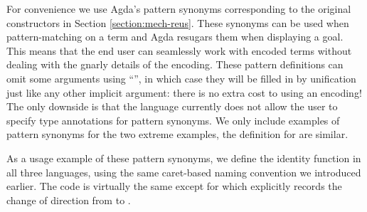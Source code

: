 \begin{center}
\begin{minipage}[t]{0.4\textwidth}
\end{minipage}\qquad
\begin{minipage}[t]{0.5\textwidth}
\end{minipage}
\end{center}

For convenience we use Agda's pattern synonyms corresponding to the
original constructors in Section \ref{section:mech-reus}. These
synonyms can be used when pattern-matching on a term and Agda resugars
them when displaying a goal. This means that the end user can
seamlessly work with encoded terms without dealing with the gnarly
details of the encoding.  These pattern definitions can omit some
arguments using ``\AS{\_}'', in which case they will be filled in
by unification just like any other implicit argument: there is no
extra cost to using an encoding!  The only downside is that the
language currently does not allow the user to specify type annotations
for pattern synonyms. We only include examples of pattern synonyms
for the two extreme examples, the definition for  are similar.

\begin{center}
\begin{minipage}{0.40\textwidth}
\end{minipage}\hspace{2.5em}
\begin{minipage}{0.50\textwidth}
\end{minipage}
\end{center}

As a usage example of these pattern synonyms, we define the identity
function in all three languages, using the
same caret-based naming convention we introduced earlier. The code
is virtually the same except for  which explicitly records
the change of direction from  to .

\begin{center}
\begin{minipage}{0.28\textwidth}
\end{minipage}\quad
\begin{minipage}{0.30\textwidth}
\end{minipage}\quad
\begin{minipage}{0.32\textwidth}
\end{minipage}
\end{center}


